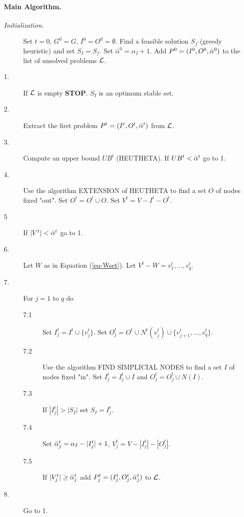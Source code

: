 \paragraph{Main Algorithm.}
\begin{description}
 \item[{\it Initialization.}] Set $t=0$, $G^0=G$,
$I^0=O^0= \emptyset$.  Find a feasible solution $S_f$ (greedy
heuristic)  and  set $S_I = S_f$. Set $\bar \alpha^0 = \alpha_I +
1$. Add  $P^0=(I^0,O^0,{\bar \alpha}^0)$ to the list of unsolved problems
${\cal L}$. 

\item[1.] If ${\cal L}$ is empty {\bf STOP}. $S_I$ is an optimum
stable set.

\item[2.] Extract the first problem $P^t=(I^t,O^t,{\bar \alpha}^t)$ from
${\cal L}$.

\item[3.] Compute an upper bound $UB^t$ (HEUTHETA). 
          If $UB^t < {\bar \alpha}^t$ go to 1.

\item[4.] Use the algorithm EXTENSION of HEUTHETA to find a
          set $O$ of nodes fixed "out". Set  $O^t = O^t \cup O$.
          Set $V^t=V-I^t-O^t$.

\item[5] If $|V^t| < {\bar \alpha}^t$ go to 1.

\item[6.] Let $W$ as in Equation (\ref{eq-Wset}). Let $V^t- W =
      v^t_1,\dots,v^t_q$. 

\item[7.] For $j = 1$ to $q$ do 
\begin{description}
  \item[7.1] Set $I^t_j = I^t \cup \{v^t_j\}$. Set 
  $O^t_j = O^t \cup N^t(v^t_j) \cup \{v^t_{j+1},\dots,v^t_q\}$.

  \item[7.2] Use the algorithm FIND SIMPLICIAL NODES to find
             a set $I$ of nodes fixed "in". Set $I^t_j =  I^t_j \cup
             I$ and  
             $O^t_j = O^t_j \cup N(I)$.
   \item[7.3] If  $|I^t_j| > |S_I|$ set $S_I =  I^t_j$. 

  \item[7.4] Set ${\bar \alpha}^t_j = \alpha_I - |I^t_j| + 1$, 
           $V^t_j=V-|I^t_j|-|O^t_j|$.

  \item[7.5] If $|V^t_j| \geq {\bar \alpha}^t_j$ add 
            $P^t_j=(I^t_j,O^t_j,{\bar \alpha}^t_j)$ to ${\cal L}$.

\end{description} 

\item[8.] Go to 1.

\end{description}
    
